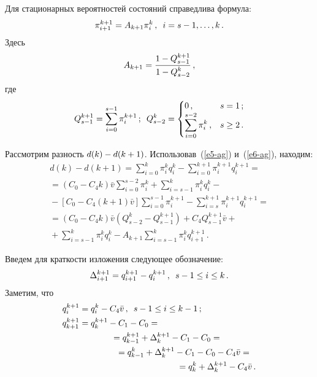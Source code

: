 \begin{multicols}{2}
Для стационарных вероятностей состояний справедлива формула:
\begin{equation}
\pi_{i+1}^{k+1} =A_{k+1}\pi_i^k\,,\enskip i=s-1, \ldots , k\,.
\label{e6-ag}
\end{equation}
Здесь
$$
A_{k+1}=\displaystyle\frac{\displaystyle 1-Q_{s-1}^{k+1}\mathstrut}{\displaystyle 1-Q^k_{s-2}\mathstrut}\,,
$$
где
$$
Q_{s-1}^{k+1}= \sum\limits_{i=0}^{s-1} \pi_i^{k+1}\,;\enskip  
Q^k_{s-2} = \begin{cases}
0\,, &s=1\,;\\
\displaystyle \sum\limits_{i=0}^{s-2} \pi_i^k\,,& s\geq 2\,.
\end{cases}
$$

Рассмотрим разность $d(k)\hm- d(k\hm+1)$. Использовав~(\ref{e5-ag})
и~(\ref{e6-ag}), находим:
\begin{multline*}
d(k) - d(k+1) =
\sum\limits^k_{i=0} \pi^k_i q^k_i -\sum\limits^{k+1}_{i=0} \pi^{k+1}_i q^{k+1}_i
={}\\
{}= \left(C_0 - C_4 k\right) \bar{v} \sum\limits^{s-2}_{i=0}
\pi^k_i  +
\sum\limits^k_{i=s-1} \pi^k_i q^k_i -{}\\
{}- \left[ C_0 -C_4
(k+1)\bar{v}\right]
\sum\limits^{s-1}_{i=0} \pi^{k+1}_i -
\sum\limits^{k+1}_{i=s} \pi^{k+1}_i q^{k+1}_i ={}\\
{}= \left(C_0 - C_4 k\right) \bar{v} \left( Q^k_{s-2} -
Q^{k+1}_{s-1}\right) +
C_4 Q^{k+1}_{s-1} \bar{v} +{}\\
{}+ \sum\limits^k_{i=s-1} \pi^k_i q^k_i -
A_{k+1} \sum\limits^k_{i=s-1} \pi^k_i q^{k+1}_{i+1}\,.
\end{multline*}

Введем для краткости изложения следующее обозначение:
$$
\Delta_{i+1}^{k+1} =q_{i+1}^{k+1}-q_i^{k+1}\,,\enskip s-1\leq i\leq k\,.
$$
Заметим, что
\begin{align*}
q^{k+1}_i &= q^k_i - C_4 \bar{v}\,, \enskip s-1\leq i \leq k-1\,;\\
q^{k+1}_{k+1} &= q^{k+1}_k - C_1 -C_0 ={}\\
&\hspace*{13mm}{}= q^{k+1}_{k-1} + \Delta^{k+1}_k - C_1 -C_0 ={}\\
&\hspace*{15mm}{}= q^k_{k-1} + \Delta^{k+1}_k - C_1 - C_0 -
C_4\bar{v} = {}\\
&\hspace*{40mm}{}=q^k_k+ \Delta^{k+1}_k - C_4 \bar{v}\,.
\end{align*}


\end{multicols}
